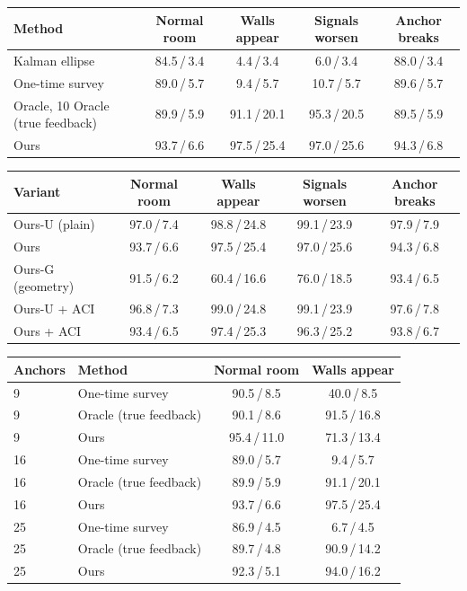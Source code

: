 \begin{tabular}{lcccc}\toprule
Method & Normal room & Walls appear & Signals worsen & Anchor breaks \\ \midrule
Kalman ellipse & 84.5\,/\,3.4 & 4.4\,/\,3.4 & 6.0\,/\,3.4 & 88.0\,/\,3.4 \\
One-time survey & 89.0\,/\,5.7 & 9.4\,/\,5.7 & 10.7\,/\,5.7 & 89.6\,/\,5.7 \\
Oracle, 10%
Oracle (true feedback) & 89.9\,/\,5.9 & 91.1\,/\,20.1 & 95.3\,/\,20.5 & 89.5\,/\,5.9 \\
Ours & 93.7\,/\,6.6 & 97.5\,/\,25.4 & 97.0\,/\,25.6 & 94.3\,/\,6.8 \\
\bottomrule\end{tabular}

\begin{tabular}{lcccc}\toprule
Variant & Normal room & Walls appear & Signals worsen & Anchor breaks \\ \midrule
Ours-U (plain) & 97.0\,/\,7.4 & 98.8\,/\,24.8 & 99.1\,/\,23.9 & 97.9\,/\,7.9 \\
Ours & 93.7\,/\,6.6 & 97.5\,/\,25.4 & 97.0\,/\,25.6 & 94.3\,/\,6.8 \\
Ours-G (geometry) & 91.5\,/\,6.2 & 60.4\,/\,16.6 & 76.0\,/\,18.5 & 93.4\,/\,6.5 \\
Ours-U + ACI & 96.8\,/\,7.3 & 99.0\,/\,24.8 & 99.1\,/\,23.9 & 97.6\,/\,7.8 \\
Ours + ACI & 93.4\,/\,6.5 & 97.4\,/\,25.3 & 96.3\,/\,25.2 & 93.8\,/\,6.7 \\
\bottomrule\end{tabular}

\begin{tabular}{llcc}\toprule
Anchors & Method & Normal room & Walls appear \\ \midrule
9 & One-time survey & 90.5\,/\,8.5 & 40.0\,/\,8.5 \\
9 & Oracle (true feedback) & 90.1\,/\,8.6 & 91.5\,/\,16.8 \\
9 & Ours & 95.4\,/\,11.0 & 71.3\,/\,13.4 \\
16 & One-time survey & 89.0\,/\,5.7 & 9.4\,/\,5.7 \\
16 & Oracle (true feedback) & 89.9\,/\,5.9 & 91.1\,/\,20.1 \\
16 & Ours & 93.7\,/\,6.6 & 97.5\,/\,25.4 \\
25 & One-time survey & 86.9\,/\,4.5 & 6.7\,/\,4.5 \\
25 & Oracle (true feedback) & 89.7\,/\,4.8 & 90.9\,/\,14.2 \\
25 & Ours & 92.3\,/\,5.1 & 94.0\,/\,16.2 \\
\bottomrule\end{tabular}
